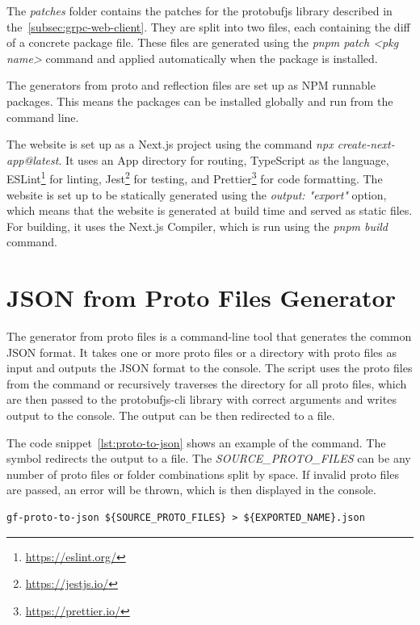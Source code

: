 The \textit{patches} folder contains the patches for the protobufjs library described in the~\ref{subsec:grpc-web-client}.
They are split into two files, each containing the diff of a concrete package file.
These files are generated using the \textit{pnpm patch <pkg name>} command and applied automatically when the package is installed.

The generators from proto and reflection files are set up as NPM runnable packages.
This means the packages can be installed globally and run from the command line.

The website is set up as a Next.js project using the command \textit{npx create-next-app@latest}.
It uses an App directory for routing, TypeScript as the language, ESLint\footnote{\url{https://eslint.org/}} for linting, Jest\footnote{\url{https://jestjs.io/}} for testing, and Prettier\footnote{\url{https://prettier.io/}} for code formatting.
The website is set up to be statically generated using the \textit{output: "export"} option, which means that the website is generated at build time and served as static files.
For building, it uses the Next.js Compiler, which is run using the \textit{pnpm build} command.


\section{JSON from Proto Files Generator}
The generator from proto files is a command-line tool that generates the common JSON format.
It takes one or more proto files or a directory with proto files as input and outputs the JSON format to the console.
The script uses the proto files from the command or recursively traverses the directory for all proto files, which are then passed to the protobufjs-cli library with correct arguments and writes output to the console.
The output can be then redirected to a file.

The code snippet~\ref{lst:proto-to-json} shows an example of the command.
The symbol \textit{\>} redirects the output to a file.
The \textit{SOURCE\_PROTO\_FILES} can be any number of proto files or folder combinations split by space.
If invalid proto files are passed, an error will be thrown, which is then displayed in the console.

\begin{lstlisting}[caption={proto-to-json command example}, label={lst:proto-to-json}]
gf-proto-to-json ${SOURCE_PROTO_FILES} > ${EXPORTED_NAME}.json
\end{lstlisting}

